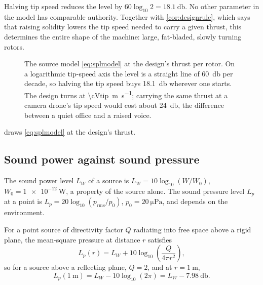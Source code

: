\begin{observation}
\label{obs:sixthpower}
Halving tip speed reduces the level by $60\log_{10}2 = \SI{18.1}{\decibel}$.
No other parameter in the model has comparable authority. Together with
\cref{cor:designrule}, which says that raising solidity lowers the tip speed
needed to carry a given thrust, this determines the entire shape of the
machine: large, fat-bladed, slowly turning rotors.
\end{observation}

\begin{figure}[tbp]
\centering

\caption{The source model \cref{eq:splmodel} at the design's thrust per rotor.
On a logarithmic tip-speed axis the level is a straight line of
\SI{60}{\decibel} per decade, so halving the tip speed buys \SI{18.1}{\decibel}
wherever one starts. The design turns at \SI{\cVtip}{\metre\per\second};
carrying the same thrust at a camera drone's tip speed would cost about
\SI{24}{\decibel}, the difference between a quiet office and a raised voice.}
\label{fig:sixth}
\end{figure}

 draws \cref{eq:splmodel} at the design's thrust.

\subsection{Sound power against sound pressure}

\begin{definition}
The sound power level $L_W$ of a source is
$L_W = 10\log_{10}(W/W_0)$, $W_0=\SI{1e-12}{\watt}$, a property of the source
alone. The sound pressure level $L_p$ at a point is
$L_p = 20\log_{10}(p_{\mathrm{rms}}/p_0)$, $p_0=\SI{20}{\micro\pascal}$, and
depends on the environment.
\end{definition}

\begin{proposition}
\label{prop:lwlp}
For a point source of directivity factor $Q$ radiating into free space above a
rigid plane, the mean-square pressure at distance $r$ satisfies
\begin{equation}
  L_p(r) = L_W + 10\log_{10}\!\left(\frac{Q}{4\pi r^2}\right) ,
  \label{eq:lwlp}
\end{equation}
so for a source above a reflecting plane, $Q=2$, and at $r=\SI{1}{\metre}$,
\begin{equation}
  L_p(\SI{1}{\metre}) = L_W - 10\log_{10}(2\pi) = L_W - \SI{7.98}{\decibel} .
  \label{eq:eightdb}
\end{equation}
\end{proposition}

